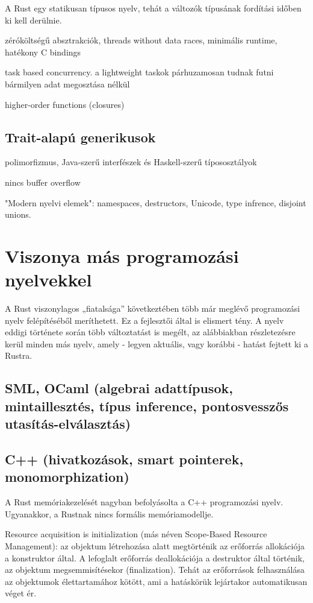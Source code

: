 A Rust egy statikusan típusos nyelv, tehát a változók típusának fordítási időben ki kell derülnie.

zéróköltségű absztrakciók, threads without data races, minimális runtime, hatékony C bindings

task based concurrency. a lightweight taskok párhuzamosan tudnak futni bármilyen adat megosztása nélkül

higher-order functions (closures)

\subsection{Trait-alapú generikusok}

polimorfizmus, Java-szerű interfészek és Haskell-szerű típososztályok

nincs buffer overflow

"Modern nyelvi elemek": namespaces, destructors, Unicode, type infrence, disjoint unions.

\section{Viszonya más programozási nyelvekkel}
A Rust viszonylagos „fiatalsága” következtében több már meglévő programozási nyelv felépítéséből meríthetett. Ez a fejlesztői által is elismert %
tény. A nyelv eddigi története során több változtatást is megélt, az alábbiakban részletezésre kerül minden más nyelv, amely - legyen aktuális, vagy korábbi - hatást fejtett ki a Rustra.

\subsection{SML, OCaml (algebrai adattípusok, mintaillesztés, típus inference, pontosvesszős utasítás-elválasztás)}

\subsection{C++ (hivatkozások, smart pointerek, monomorphization)}
A Rust memóriakezelését nagyban befolyásolta a C++ programozási nyelv. Ugyanakkor, a Rustnak nincs formális memóriamodellje.

Resource acquisition is initialization (más néven Scope-Based Resource Management): az objektum létrehozása alatt megtörténik az erőforrás allokációja a konstruktor által. A lefoglalt erőforrás deallokációja a destruktor által történik, az objektum megsemmisítésekor (finalization).  Tehát az erőforrások felhasználása az objektumok élettartamához kötött, ami a hatáskörük lejártakor automatikusan véget ér.

